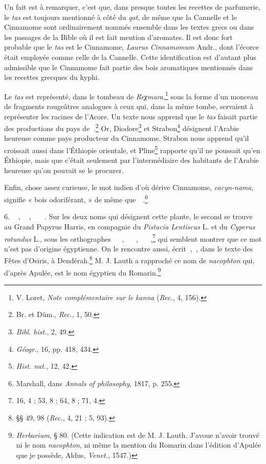 \documentclass[a4paper, 11pt, oneside, landscape]{article}
\newcommand*\hieroAAAB{}
\newcommand*\hieroAAAI{}
\newcommand*\hieroAAAM{}
\newcommand*\hieroAAAR{}
\newcommand*\hieroAABT{}
\newcommand*\hieroAABV{}
\newcommand*\hieroAACY{}
\newcommand*\hieroAADK{}
\newcommand*\hieroAADL{}
\newcommand*\hieroAAFO{\raisebox{0.5ex}{}}
\newcommand*\hieroAAFW{}
\newcommand*\hieroAAGB{}
\newcommand*\hieroAAGE{}
\newcommand*\hieroAAGJ{}
\newcommand*\hieroAAHH{}
\newcommand*\hieroAAHL{}
\newcommand*\hieroAAHV{}
\newcommand*\hieroAAHW{}
\newcommand*\hieroAAIW{}
\newcommand*\hieroAAUQ{}
\newcommand*\hieroAAVX{}
\newcommand*\hieroAAVY{}
\newcommand*\hieroAAVZ{}
\newcommand*\hieroAAWA{}
\newcommand*\hieroAAWB{}
\begin{document}
Un fait est à remarquer, c'est que, dans presque toutes les recettes de parfumerie, le \emph{tas} est toujours mentionné à côté du \emph{qat}, de même que la Cannelle et le Cinnamome sont ordinairement nommés ensemble dans les textes grecs ou dans les passages de la Bible où il est fait mention d'aromates. Il est donc fort probable que le \emph{tas} est le Cinnamome, \emph{Laurus Cinnamomum} Andr., dont l'écorce était employée comme celle de la Cannelle. Cette identification est d'autant plus admissible que le Cinnamome fait partie des bois aromatiques mentionnés dans les recettes grecques du kyphi.

Le \emph{tas} est représenté, dans le tombeau de \emph{Reχmara},\footnote{V. Loret, \emph{Note complémentaire sur le kanna} (\emph{Rec.}, 4, 156).} sous la forme d'un monceau de fragments rougeâtres analogues à ceux qui, dans la même tombe, servaient à représenter les racines de l'Acore. Un texte nous apprend que le \emph{tas} faisait partie des productions du pays de $\hieroAAAI\:\hieroAAVX$.\footnote{Br. et Düm., \emph{Rec.}, 1, 50.} Or, Diodore\footnote{\emph{Bibl. hist.}, 2, 49.} et Strabon\footnote{\emph{Géogr.}, 16, pp. 418, 434.} désignent l'Arabie heureuse comme pays producteur du Cinnamome. Strabon nous apprend qu'il croissait aussi dans l'Éthiopie orientale, et Pline\footnote{\emph{Hist. nat.}, 12, 42.} rapporte qu'il ne poussait qu'en Éthiopie, mais que c'était seulement par l'intermédiaire des habitants de l'Arabie heureuse qu'on pouvait se le procurer.

Enfin, chose assez curieuse, le mot indien d'où dérive Cinnamome, \emph{cacyn-nama}, signifie « bois odoriférant, » de même que $\hieroAAHL\:\hieroAADK\:\hieroAADK\:\hieroAABV$.\footnote{Marshall, dans \emph{Annals of philosophy}, 1817, p. 255.}

6. $\hieroAAGE\:\hieroAAAB\:\hieroAAAM\:\hieroAAAM\:\hieroAAAR$, $\hieroAAGJ\:\hieroAAAB\:\hieroAAAM\:\hieroAAAM\:\hieroAADL$, $\hieroAAGE\:\hieroAAAB\:\hieroAAAM\:\hieroAAAM\:\hieroAABV\:\hieroAAHH\:\hieroAAHV\:\hieroAAHW$. Sur les deux noms qui désignent cette plante, le second se trouve au Grand Papyrus Harris, en compagnie du \emph{Pistacia Lentiscus} L. et du \emph{Cyperus rotundus} L., sous les orthographes $\hieroAAVY\:\hieroAAIW\:\hieroAAAB\:\hieroAAGB\:\hieroAAAM\:\hieroAAFO$, $\hieroAAVY\:\hieroAAVZ\:\hieroAAAB\:\hieroAAGB\:\hieroAAAM\:\hieroAAUQ\:\hieroAABT$, $\hieroAAVY\:\hieroAAIW\:\hieroAAAB\:\hieroAAGB\:\hieroAAAM\:\hieroAACY\:\hieroAAFO$,\footnote{16, 4 ; 53, 8 ; 64, 8 ; 71, 4.} qui semblent montrer que ce mot n'est pas d'origine égyptienne. On le rencontre aussi, écrit $\hieroAAWA\:\hieroAAWB$, $\hieroAAHV\:\hieroAAFW$, dans le texte des Fêtes d'Osiris, à Dendérah.\footnote{§§ 49, 98 (\emph{Rec.}, 4, 21 ; 5, 93).} M. J. Lauth a rapproché ce nom de \emph{nacophton} qui, d'après Apulée, est le nom égyptien du Romarin.\footnote{\emph{Herbarium}, § 80. (Cette indication est de M. J. Lauth. J'avoue n'avoir trouvé ni le nom \emph{nacophton}, ni même la mention du Romarin dans l'édition d'Apulée que je possède, Aldus, \emph{Venet.}, 1547.)}
\end{document}
